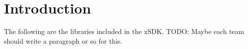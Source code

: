 \chapter*{Introduction}
The following are the libraries included in the xSDK.
{\color{red}TODO: Maybe each team should write a paragraph or so for this.}







